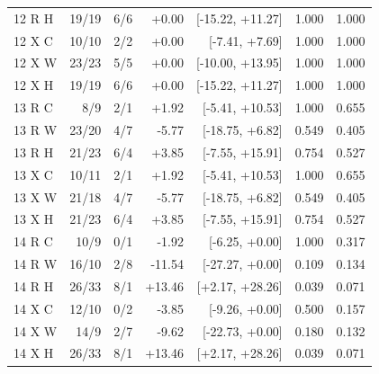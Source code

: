 \begin{longtable}{lrrrrrr}
12 R H & 19/19 & 6/6 & +0.00 & [-15.22, +11.27] & 1.000 & 1.000\\
12 X C & 10/10 & 2/2 & +0.00 & [-7.41, +7.69] & 1.000 & 1.000\\
12 X W & 23/23 & 5/5 & +0.00 & [-10.00, +13.95] & 1.000 & 1.000\\
12 X H & 19/19 & 6/6 & +0.00 & [-15.22, +11.27] & 1.000 & 1.000\\
13 R C & 8/9 & 2/1 & +1.92 & [-5.41, +10.53] & 1.000 & 0.655\\
13 R W & 23/20 & 4/7 & -5.77 & [-18.75, +6.82] & 0.549 & 0.405\\
13 R H & 21/23 & 6/4 & +3.85 & [-7.55, +15.91] & 0.754 & 0.527\\
13 X C & 10/11 & 2/1 & +1.92 & [-5.41, +10.53] & 1.000 & 0.655\\
13 X W & 21/18 & 4/7 & -5.77 & [-18.75, +6.82] & 0.549 & 0.405\\
13 X H & 21/23 & 6/4 & +3.85 & [-7.55, +15.91] & 0.754 & 0.527\\
14 R C & 10/9 & 0/1 & -1.92 & [-6.25, +0.00] & 1.000 & 0.317\\
14 R W & 16/10 & 2/8 & -11.54 & [-27.27, +0.00] & 0.109 & 0.134\\
14 R H & 26/33 & 8/1 & +13.46 & [+2.17, +28.26] & 0.039 & 0.071\\
14 X C & 12/10 & 0/2 & -3.85 & [-9.26, +0.00] & 0.500 & 0.157\\
14 X W & 14/9 & 2/7 & -9.62 & [-22.73, +0.00] & 0.180 & 0.132\\
14 X H & 26/33 & 8/1 & +13.46 & [+2.17, +28.26] & 0.039 & 0.071\\
\bottomrule\end{longtable}